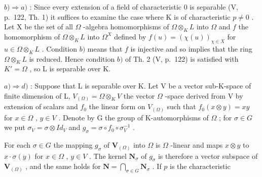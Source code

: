 \(b) \Rightarrow a)\) : Since every extension of a field of characteristic 0 is separable (V, p.~122, Th. 1) it suffices to examine the case where K is of characteristic \(p \neq 0\) . Let X be the set of all \(\Omega\) -algebra homomorphisms of \(\Omega \otimes_{K} L\) into \(\Omega\) and \(f\) the homomorphism of \(\Omega \otimes_{K} L\) into \(\Omega^{X}\) defined by \(f(u) = (\chi(u))_{\chi \in X}\) for \(u \in \Omega \otimes_{K} L\) . Condition \(b)\) means that \(f\) is injective and so implies that the ring \(\Omega \otimes_{K} L\) is reduced. Hence condition \(b)\) of Th. 2 (V, p.~122) is satisfied with \(K' = \Omega\) , so L is separable over K.

\(a) \Rightarrow d)\) : Suppose that L is separable over K. Let V be a vector sub-K-space of finite dimension of L, \(V_{(\Omega)} = \Omega \otimes_K V\) the vector \(\Omega\) -space derived from V by extension of scalars and \(f_0\) the linear form on \(V_{(\Omega)}\) such that \(f_0(x \otimes y) = xy\) for \(x \in \Omega\) , \(y \in V\) . Denote by G the group of K-automorphisms of \(\Omega\) ; for \(\sigma \in G\) we put \(\sigma_V = \sigma \otimes Id_V\) and \(g_\sigma = \sigma \circ f_0 \circ \sigma_V^{-1}\) .

For each \(\sigma \in G\) the mapping \(g_{\sigma}\) of \(\mathbf{V}_{(\Omega)}\) into \(\Omega\) is \(\Omega\) -linear and maps \(x \otimes y\) to \(x \cdot \sigma(y)\) for \(x \in \Omega\) , \(y \in V\) . The kernel \(\mathbf{N}_{\sigma}\) of \(g_{\sigma}\) is therefore a vector subspace of \(\mathbf{V}_{(\Omega)}\) , and the same holds for \(\mathbf{N} = \bigcap_{\sigma \in G} \mathbf{N}_{\sigma}\) . If \(p\) is the characteristic

